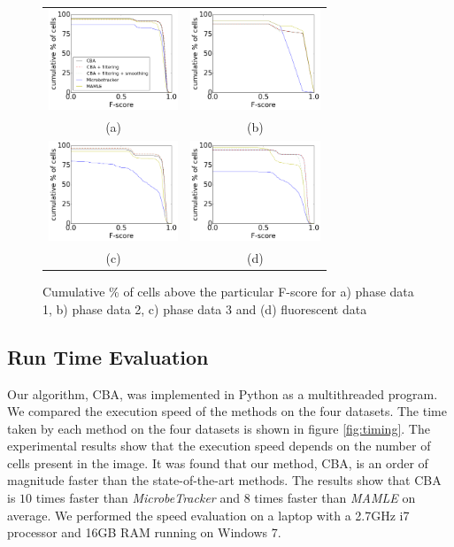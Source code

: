 \documentclass[journal]{IEEEtran}
\begin{document}
\begin{figure}[!h]
	\centering
	\begin{tabular}{c c }
		\includegraphics[height=3cm]{phasdat1fscorecumul.png} & \includegraphics[height=3cm]{phasdat2fscorecumul.png} \\
		(a) & (b)\\
		\includegraphics[height=3cm]{phasdat3fscorecumul.png} &
		\includegraphics[height=3cm]{fluofscorecumul.png}\\
		(c) & (d)
	\end{tabular}
	\caption{Cumulative \% of cells above the particular F-score for a) phase data 1, b) phase data 2, c) phase data 3 and (d) fluorescent data }
	\label{fig:fscorecumul}
	
\end{figure}




\subsection{Run Time Evaluation}
Our algorithm, CBA, was implemented in Python as a multithreaded program. We compared the execution speed of the methods on the four datasets. The time taken by each method on the four datasets is shown in figure \ref{fig:timing}. The experimental results show that the execution speed depends on the number of cells present in the image. It was found that our method, CBA, is an order of magnitude faster than the state-of-the-art methods. The results show that CBA is $10$ times faster than \textit{MicrobeTracker} and $8$ times faster than \textit{MAMLE} on average. We performed the speed evaluation on a laptop with a 2.7GHz i7 processor and 16GB RAM running on Windows 7.
\end{document}
